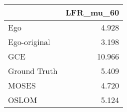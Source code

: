 \begin{tabular}{lr}
\toprule
{} & LFR_mu_60 \\
\midrule
Ego          &     4.928 \\
Ego-original &     3.198 \\
GCE          &    10.966 \\
Ground Truth &     5.409 \\
MOSES        &     4.720 \\
OSLOM        &     5.124 \\
\bottomrule
\end{tabular}
